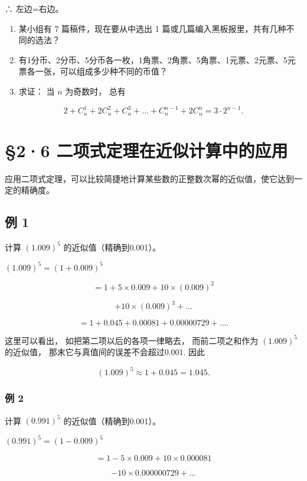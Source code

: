 ∴ 左边=右边。

\begin{enumerate}
\item
  某小组有 7 篇稿件，现在要从中选出 1
  篇或几篇编入黑板报里，共有几种不同的选法？
\item
  有1分币、2分币、5分币各一枚，1角票、2角票、5角票、1元票、2元票、5元票各一张，可以组成多少种不同的币值？
\item
  求证： 当 \(n\) 为奇数时， 总有
\end{enumerate}

\[
2 + C _ {n} ^ {1} + 2 C _ {n} ^ {2} + C _ {n} ^ {3} + \dots + C _ {n} ^ {n - 1} + 2 C _ {n} ^ {n} = 3 \cdot 2 ^ {n - 1}.
\]

\section{§2·6 二项式定理在近似计算中的应用}

应用二项式定理，可以比较简捷地计算某些数的正整数次幂的近似值，使它达到一定的精确度。

\subsection{例 1}

计算 \((1.009)^{5}\) 的近似值（精确到0.001）。

 \((1.009)^{5} = (1 + 0.009)^{5}\)

\[
= 1 + 5 \times 0.009 + 10 \times (0.009) ^ {2}
\]

\[
+ 10 \times (0.009) ^ {3} + \dots
\]

\[
= 1 + 0.045 + 0.00081 + 0.00000729 + \dots .
\]

这里可以看出， 如把第二项以后的各项一律略去， 而前二项之和作为
\((1.009)^{5}\) 的近似值， 那末它与真值间的误差不会超过0.001. 因此

\[
(1.009) ^ {5} \approx 1 + 0.045 = 1.045.
\]

\subsubsection{例 2}

计算 \((0.991)^{5}\) 的近似值（精确到0.001）。

 \((0.991)^{5} = (1 - 0.009)^{5}\)

\[
= 1 - 5 \times 0.009 + 10 \times 0.000081
\]

\[
- 10 \times 0.000000729 + \dots
\]

